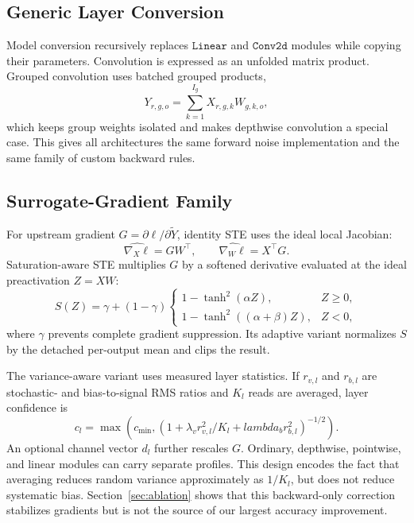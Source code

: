 \documentclass[10pt,twocolumn,letterpaper]{article}
\begin{document}
\subsection{Generic Layer Conversion}

Model conversion recursively replaces $\texttt{Linear}$ and
$\texttt{Conv2d}$ modules while copying their parameters.  Convolution is
expressed as an unfolded matrix product.  Grouped convolution uses batched
grouped products,
\begin{equation}
Y_{r,g,o}=\sum_{k=1}^{I_g}X_{r,g,k}W_{g,k,o},
\label{eq:grouped}
\end{equation}
which keeps group weights isolated and makes depthwise convolution a special
case.  This gives all architectures the same forward noise implementation and
the same family of custom backward rules.

\subsection{Surrogate-Gradient Family}

For upstream gradient $G=\partial\ell/\partial\widetilde{Y}$, identity STE
uses the ideal local Jacobian:
\begin{equation}
  \widehat{\nabla_X\ell}=GW^\top,\qquad
  \widehat{\nabla_W\ell}=X^\top G.
  \label{eq:identity_ste}
\end{equation}
Saturation-aware STE multiplies $G$ by a softened derivative evaluated at the
ideal preactivation $Z=XW$:
\begin{equation}
  S(Z)=\gamma+(1-\gamma)
  \begin{cases}
  1-\tanh^2(\alpha Z),&Z\geq0,\\
  1-\tanh^2((\alpha+\beta)Z),&Z<0,
  \end{cases}
  \label{eq:saturation_scale}
\end{equation}
where $\gamma$ prevents complete gradient suppression.  Its adaptive variant
normalizes $S$ by the detached per-output mean and clips the result.

The variance-aware variant uses measured layer statistics.  If $r_{v,l}$ and
$r_{b,l}$ are stochastic- and bias-to-signal RMS ratios and $K_l$ reads are
averaged, layer confidence is
\begin{equation}
 c_l=\max\!\left(c_{\min},
 \left(1+\lambda_v r_{v,l}^2/K_l+lambda_b r_{b,l}^2\right)^{-1/2}\right).
 \label{eq:confidence}
\end{equation}
An optional channel vector $d_l$ further rescales $G$.  Ordinary, depthwise,
pointwise, and linear modules can carry separate profiles.  This design encodes
the fact that averaging reduces random variance approximately as $1/K_l$, but
does not reduce systematic bias.  Section~\ref{sec:ablation} shows that this
backward-only correction stabilizes gradients but is not the source of our
largest accuracy improvement.
\end{document}
